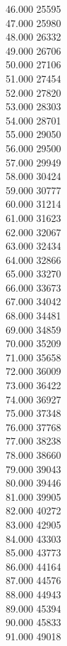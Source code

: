 { 46.000	25595 \\
 47.000	25980 \\
 48.000	26332 \\
 49.000	26706 \\
 50.000	27106 \\
 51.000	27454 \\
 52.000	27820 \\
 53.000	28303 \\
 54.000	28701 \\
 55.000	29050 \\
 56.000	29500 \\
 57.000	29949 \\
 58.000	30424 \\
 59.000	30777 \\
 60.000	31214 \\
 61.000	31623 \\
 62.000	32067 \\
 63.000	32434 \\
 64.000	32866 \\
 65.000	33270 \\
 66.000	33673 \\
 67.000	34042 \\
 68.000	34481 \\
 69.000	34859 \\
 70.000	35209 \\
 71.000	35658 \\
 72.000	36009 \\
 73.000	36422 \\
 74.000	36927 \\
 75.000	37348 \\
 76.000	37768 \\
 77.000	38238 \\
 78.000	38660 \\
 79.000	39043 \\
 80.000	39446 \\
 81.000	39905 \\
 82.000	40272 \\
 83.000	42905 \\
 84.000	43303 \\
 85.000	43773 \\
 86.000	44164 \\
 87.000	44576 \\
 88.000	44943 \\
 89.000	45394 \\
 90.000	45833 \\
 91.000	49018 \\
}
